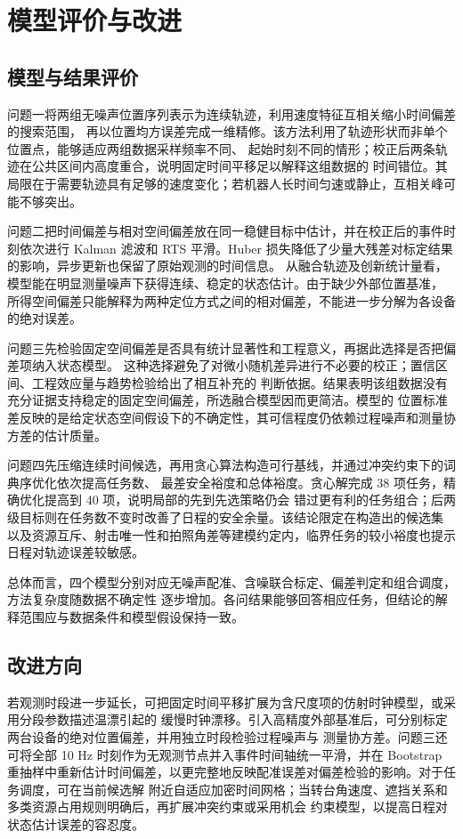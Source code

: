 \section{模型评价与改进}\label{sec:overall-evaluation}

\subsection{模型与结果评价}

问题一将两组无噪声位置序列表示为连续轨迹，利用速度特征互相关缩小时间偏差的搜索范围，
再以位置均方误差完成一维精修。该方法利用了轨迹形状而非单个位置点，能够适应两组数据采样频率不同、
起始时刻不同的情形；校正后两条轨迹在公共区间内高度重合，说明固定时间平移足以解释这组数据的
时间错位。其局限在于需要轨迹具有足够的速度变化；若机器人长时间匀速或静止，互相关峰可能不够突出。

问题二把时间偏差与相对空间偏差放在同一稳健目标中估计，并在校正后的事件时刻依次进行 Kalman
滤波和 RTS 平滑。Huber 损失降低了少量大残差对标定结果的影响，异步更新也保留了原始观测的时间信息。
从融合轨迹及创新统计量看，模型能在明显测量噪声下获得连续、稳定的状态估计。由于缺少外部位置基准，
所得空间偏差只能解释为两种定位方式之间的相对偏差，不能进一步分解为各设备的绝对误差。

问题三先检验固定空间偏差是否具有统计显著性和工程意义，再据此选择是否把偏差项纳入状态模型。
这种选择避免了对微小随机差异进行不必要的校正；置信区间、工程效应量与趋势检验给出了相互补充的
判断依据。结果表明该组数据没有充分证据支持稳定的固定空间偏差，所选融合模型因而更简洁。模型的
位置标准差反映的是给定状态空间假设下的不确定性，其可信程度仍依赖过程噪声和测量协方差的估计质量。

问题四先压缩连续时间候选，再用贪心算法构造可行基线，并通过冲突约束下的词典序优化依次提高任务数、
最差安全裕度和总体裕度。贪心解完成 38 项任务，精确优化提高到 40 项，说明局部的先到先选策略仍会
错过更有利的任务组合；后两级目标则在任务数不变时改善了日程的安全余量。该结论限定在构造出的候选集
以及资源互斥、射击唯一性和拍照角差等建模约定内，临界任务的较小裕度也提示日程对轨迹误差较敏感。

总体而言，四个模型分别对应无噪声配准、含噪联合标定、偏差判定和组合调度，方法复杂度随数据不确定性
逐步增加。各问结果能够回答相应任务，但结论的解释范围应与数据条件和模型假设保持一致。

\subsection{改进方向}

若观测时段进一步延长，可把固定时间平移扩展为含尺度项的仿射时钟模型，或采用分段参数描述温漂引起的
缓慢时钟漂移。引入高精度外部基准后，可分别标定两台设备的绝对位置偏差，并用独立时段检验过程噪声与
测量协方差。问题三还可将全部 10 Hz 时刻作为无观测节点并入事件时间轴统一平滑，并在 Bootstrap
重抽样中重新估计时间偏差，以更完整地反映配准误差对偏差检验的影响。对于任务调度，可在当前候选解
附近自适应加密时间网格；当转台角速度、遮挡关系和多类资源占用规则明确后，再扩展冲突约束或采用机会
约束模型，以提高日程对状态估计误差的容忍度。
